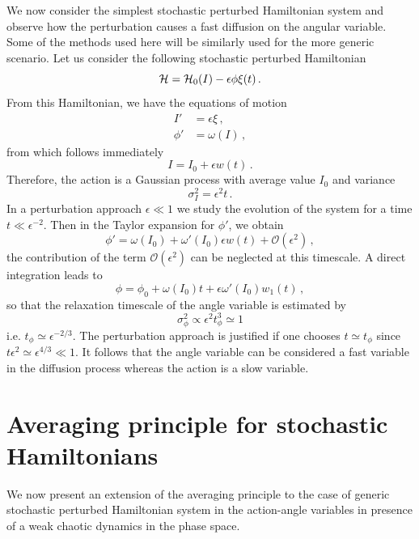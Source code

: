 We now consider the simplest stochastic perturbed Hamiltonian system and observe how the perturbation causes a fast diffusion on the angular variable. Some of the methods used here will be similarly used for the more generic scenario. Let us consider the following stochastic perturbed Hamiltonian
\begin{equation}
	\mathcal{H} = \mathcal{H}_0(I) - \epsilon \phi \xi(t)\,.
\end{equation}
From this Hamiltonian, we have the equations of motion
\begin{equation}
	\begin{aligned}
		{I'} &= \epsilon\xi\,, \\
		{\phi'} &= \omega(I)\,,
	\end{aligned}
\end{equation}
from which follows immediately
\begin{equation}
	I = I_0 + \epsilon w(t)\,.
\end{equation}
Therefore, the action is a Gaussian process with average value $I_0$ and variance
\begin{equation}
	\sigma_{I}^2=\epsilon^2t\,.
\end{equation}
In a perturbation approach $\epsilon\ll 1$ we study the evolution of the system for a time $t\ll \epsilon^{-2}$. Then in the  Taylor expansion for \({\phi'}\), we obtain
\begin{equation}
	{\phi'} = \omega(I_0) + \omega'(I_0)\epsilon w(t) + \mathcal{O}(\epsilon^2)\,,
\end{equation}
the contribution of the term $\mathcal{O}(\epsilon^2)$ can be neglected at this timescale. A direct integration leads to
\begin{equation}
	\phi = \phi_0 + \omega(I_0)t + \epsilon \omega'(I_0) w_1(t)\,,
\end{equation}
so that the relaxation timescale of the angle variable is estimated by
\begin{equation}
	\sigma_{\phi}^2 \propto \epsilon^2 t_\phi^3\simeq 1
\end{equation}
i.e. $t_\phi\simeq \epsilon^{-2/3}$. The perturbation approach is justified if one chooses $t\simeq t_\phi$ since $t\epsilon^2\simeq \epsilon^{4/3}\ll 1$. It follows that the angle variable can be considered a fast variable in the diffusion process whereas the action is a slow variable.

%
\section{Averaging principle for stochastic Hamilto\-nians}
%
We now present an extension of the averaging principle to the case of generic stochastic perturbed Hamiltonian system in the action-angle variables in presence of a weak chaotic dynamics in the phase space.

